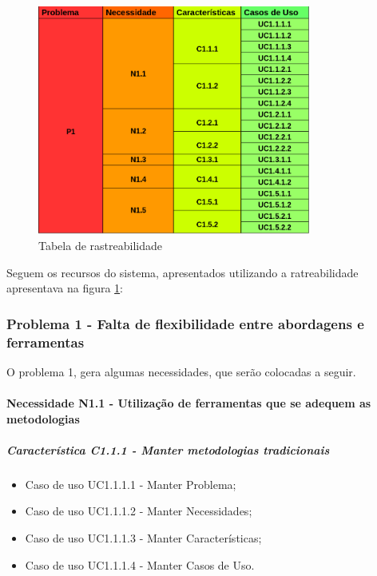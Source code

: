 \begin{figure}[H]
	\centering
	\includegraphics[width=0.8\textwidth]{imgModelagem/tabelaRastreabilidade}
	\caption{Tabela de rastreabilidade}
	\label{img:tabelaRastreabilidade}
\end{figure}

Seguem os recursos do sistema, apresentados utilizando a ratreabilidade apresentava na figura \ref{img:tabelaRastreabilidade}:

\subsubsection{Problema 1 - Falta de flexibilidade entre abordagens e ferramentas}

O problema 1, gera algumas necessidades, que serão colocadas a seguir.

\paragraph{Necessidade N1.1 - Utilização de ferramentas que se adequem as metodologias}

	\subparagraph{Característica C1.1.1 - Manter metodologias tradicionais}
		\begin{itemize}
			\item Caso de uso UC1.1.1.1 - Manter Problema;
			\item Caso de uso UC1.1.1.2 - Manter Necessidades;
			\item Caso de uso UC1.1.1.3 - Manter Características;
			\item Caso de uso UC1.1.1.4 - Manter Casos de Uso.
		\end{itemize}
	
